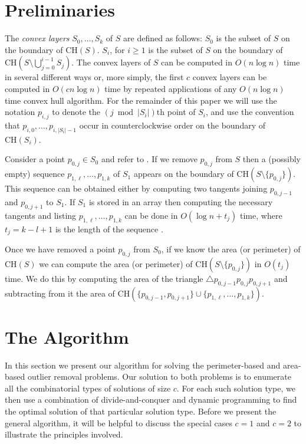 \documentclass[lotsofwhite]{patmorin}
\newcommand{\ch}{\mathrm{CH}}
\begin{document}
\section{Preliminaries} 

The \emph{convex layers} $S_0,\ldots,S_k$ of $S$ are defined as
follows: $S_0$ is the subset of $S$ on the boundary of $\ch(S)$.
$S_i$, for $i\ge 1$ is the subset of $S$ on the boundary of
$\ch(S\setminus\bigcup_{j=0}^{i-1} S_j)$.  The convex layers of $S$
can be computed in $O(n\log n)$ time in several different ways
\cite{X,Y,Z} or, more simply, the first $c$ convex layers can be
computed in $O(cn\log n)$ time by repeated applications of any
$O(n\log n)$ time convex hull algorithm.  For the remainder of this
paper we will use the notation $p_{i,j}$ to denote the $(j\bmod
|S_i|)$th point of $S_i$, and use the convention that
$p_{i,0},\ldots,p_{i,|S_i|-1}$ occur in counterclockwise order on the
boundary of $\ch(S_i)$.

Consider a point $p_{0,j}\in S_0$ and refer to .
If we remove $p_{0,j}$ from $S$ then a (possibly empty) sequence
$p_{1,\ell},\ldots,p_{1,k}$ of $S_1$ appears on the boundary of
$\ch(S\setminus\{p_{0,j}\})$.  This sequence can be obtained either by
computing two tangents joining $p_{0,j-1}$ and $p_{0,j+1}$ to $S_1$.
If $S_1$ is stored in an array then computing the necessary tangents
and listing $p_{1,\ell},\ldots,p_{1,k}$ can be done in $O(\log n+t_j)$
time, where $t_j=k-l+1$ is the length of the sequence \cite{X}.

Once we have removed a point $p_{0,j}$ from $S_0$, if we know the area
(or perimeter) of $\ch(S)$ we can compute the area (or perimeter) of
$\ch(S\setminus\{p_{0,j}\})$ in $O(t_j)$ time.  We do this by
computing the area of the triangle $\triangle
p_{0,j-1}p_{0,j}p_{0,j+1}$ and subtracting from it the area of
$\ch(\{p_{0,j-1},p_{0,j+1}\}\cup\{p_{1,\ell},\ldots,p_{1,k}\})$.


\section{The Algorithm}

In this section we present our algorithm for solving the
perimeter-based and area-based outlier removal problems. Our solution
to both problems is to enumerate all the combinatorial types of
solutions of size $c$.  For each such solution type, we then use a
combination of divide-and-conquer and dynamic programming to find the
optimal solution of that particular solution type.  Before we present
the general algorithm, it will be helpful to discuss the special cases
$c=1$ and $c=2$ to illustrate the principles involved.
\end{document}
